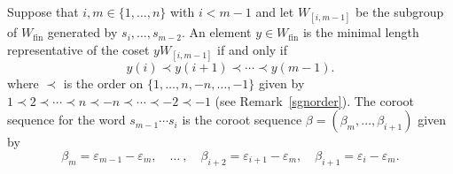 \documentclass[11pt]{article}
\theoremstyle{plain}
\theoremstyle{definition}
\theoremstyle{remark}
\numberwithin{equation}{section}
\newcounter{r}
\newcounter{s}
\begin{document}
Suppose that $i, m\in \{1, \ldots, n\}$ with $i< m-1$ and let $W_{[i,m-1]}$ be the subgroup of $W_{\mathrm{fin}}$ generated
by $s_i, \ldots, s_{m-2}$.  An element $y \in W_{\mathrm{fin}}$ is the minimal length representative of the coset $yW_{[i,m-1]}$ if and only if
$$y(i) \prec y(i+1) \prec \cdots \prec y(m-1).$$ 
where $\prec$ is the order on $\{1, \ldots, n, -n, \ldots, -1\}$ given by
$1\prec 2\prec \cdots \prec n \prec -n \prec \cdots \prec -2\prec -1$ (see Remark~\ref{sgnorder}).
The coroot sequence for the word $s_{m-1}\cdots s_i$ is the coroot sequence $\beta = (\beta_m, \ldots, \beta_{i+1})$ given by
\begin{equation}
\beta_m = \varepsilon_{m-1}-\varepsilon_m, \quad\ldots\ , \quad
\beta_{i+2} = \varepsilon_{i+1}-\varepsilon_m, \quad \beta_{i+1} = \varepsilon_i-\varepsilon_m.
\label{0gapcrtseq}
\end{equation}
\end{document}
